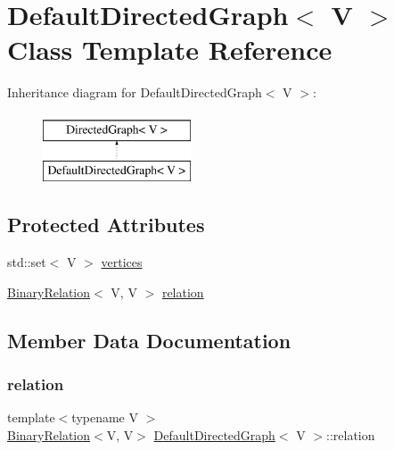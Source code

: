 \hypertarget{classDefaultDirectedGraph}{}\section{Default\+Directed\+Graph$<$ V $>$ Class Template Reference}
\label{classDefaultDirectedGraph}
Inheritance diagram for Default\+Directed\+Graph$<$ V $>$\+:\begin{figure}[H]
\begin{center}
\leavevmode
\includegraphics[height=2.000000cm]{classDefaultDirectedGraph}
\end{center}
\end{figure}
\subsection*{Protected Attributes}
\begin{DoxyCompactItemize}
\item 
std\+::set$<$ V $>$ \hyperlink{classDefaultDirectedGraph_ab5975523e831ac6142652b29887fd3b8}{vertices}
\item 
\hyperlink{classBinaryRelation}{Binary\+Relation}$<$ V, V $>$ \hyperlink{classDefaultDirectedGraph_aa944f22b8a0393324a0fe1238b0f625f}{relation}
\end{DoxyCompactItemize}


\subsection{Member Data Documentation}
\mbox{\label{classDefaultDirectedGraph_aa944f22b8a0393324a0fe1238b0f625f}} 
\subsubsection{\texorpdfstring{relation}{relation}}
{\footnotesize\ttfamily template$<$typename V $>$ \\
\hyperlink{classBinaryRelation}{Binary\+Relation}$<$V, V$>$ \hyperlink{classDefaultDirectedGraph}{Default\+Directed\+Graph}$<$ V $>$\+::relation\hspace{0.3cm}{\ttfamily [protected]}}

